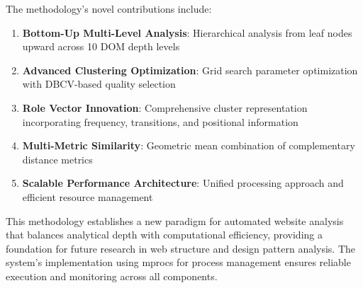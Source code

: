 The methodology's novel contributions include:

\begin{enumerate}
    \item \textbf{Bottom-Up Multi-Level Analysis}: Hierarchical analysis from leaf nodes upward across 10 DOM depth levels
    \item \textbf{Advanced Clustering Optimization}: Grid search parameter optimization with DBCV-based quality selection
    \item \textbf{Role Vector Innovation}: Comprehensive cluster representation incorporating frequency, transitions, and positional information
    \item \textbf{Multi-Metric Similarity}: Geometric mean combination of complementary distance metrics
    \item \textbf{Scalable Performance Architecture}: Unified processing approach and efficient resource management
\end{enumerate}

This methodology establishes a new paradigm for automated website analysis that balances analytical depth with computational efficiency, providing a foundation for future research in web structure and design pattern analysis. The system's implementation using mprocs for process management ensures reliable execution and monitoring across all components. 